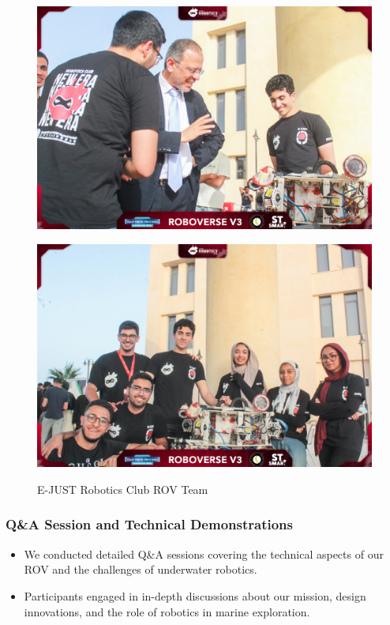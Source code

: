 \documentclass[a4paper,12pt]{article}
\begin{document}
\begin{figure}[h]
    \centering
    \begin{minipage}{0.48\textwidth}
        \centering
        \includegraphics[width=\textwidth]{ROV1.jpg}
        
        \label{fig:figure1}
    \end{minipage}
    \hfill
    \begin{minipage}{0.48\textwidth}
        \centering
        \includegraphics[width=\textwidth]{ROV2.jpg}
      
        \label{fig:figure2}
    \end{minipage}
    \caption{E-JUST Robotics Club ROV Team}
    \label{fig:both_figures}
\end{figure}

\subsubsection{Q\&A Session and Technical Demonstrations}
\begin{itemize}
    \item We conducted detailed Q\&A sessions covering the technical aspects of our ROV and the challenges of underwater robotics.
    \item Participants engaged in in-depth discussions about our mission, design innovations, and the role of robotics in marine exploration.
\end{itemize}
\end{document}
